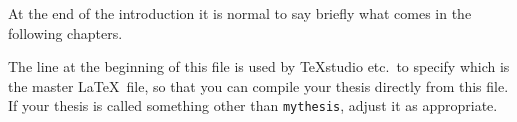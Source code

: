 At the end of the introduction it is normal to say briefly what comes
in the following chapters.

The line at the beginning of this file is used by TeXstudio etc.\ to
specify which is the master \LaTeX\ file, so that you can compile your thesis
directly from this file.
If your thesis is called something other than \texttt{mythesis}, adjust it as appropriate.

